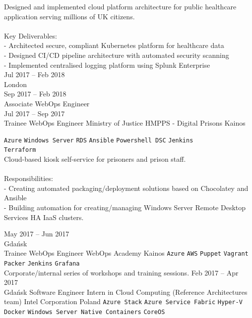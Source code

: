 \documentclass[9pt]{style/developercv}
\begin{document}
\begin{entrylist}
{      Designed and implemented cloud platform architecture for public healthcare application serving millions of UK citizens.\\
      \\
      Key Deliverables:\\
      - Architected secure, compliant Kubernetes platform for healthcare data\\
      - Designed CI/CD pipeline architecture with automated security scanning\\
      - Implemented centralised logging platform using Splunk Enterprise\\
        }
	\entry
    {Jul 2017 -- Feb 2018\\\footnotesize{London}
    \\Sep 2017 -- Feb 2018\\\footnotesize{Associate WebOps Engineer}
    \\Jul 2017 -- Sep 2017\\\footnotesize{Trainee WebOps Engineer}}
		{Ministry of Justice HMPPS - Digital Prisons}
		{Kainos}
		{
			\texttt{Azure}\slashsep
			\texttt{Windows Server}\slashsep
			\texttt{RDS}\slashsep
			\texttt{Ansible}\slashsep
			\texttt{Powershell DSC}\slashsep
      \texttt{Jenkins}\\
      \texttt{Terraform}\\

      Cloud-based kiosk self-service for prisoners and prison staff. \\
      \\
      Responsibilities:\\
      - Creating automated packaging/deployment solutions based on Chocolatey and Ansible\\
      - Building automation for creating/managing Windows Server Remote Desktop Services HA IaaS clusters.

		}
	\entry
    {May 2017 -- Jun 2017\\\footnotesize{Gdańsk}\\
    \footnotesize{Trainee WebOps Engineer}}
		{WebOps Academy}
		{Kainos}
		{
			\texttt{Azure}\slashsep
			\texttt{AWS}\slashsep
			\texttt{Puppet}\slashsep
			\texttt{Vagrant}\slashsep
			\texttt{Packer}\slashsep
			\texttt{Jenkins}\slashsep
			\texttt{Grafana}\\

      Corporate/internal series of workshops and training sessions.
		}
	\entry
		{Feb 2017 -- Apr 2017\\\footnotesize{Gdańsk}}
		{Software Engineer Intern in Cloud Computing (Reference Architectures team)}
		{Intel Corporation Poland}
		{
      \texttt{Azure Stack}\slashsep
      \texttt{Azure Service Fabric}\slashsep
      \texttt{Hyper-V}\slashsep
      \texttt{Docker}\slashsep
			\texttt{Windows Server Native Containers}\slashsep
			\texttt{CoreOS}\\

}
\end{entrylist}
\end{document}
